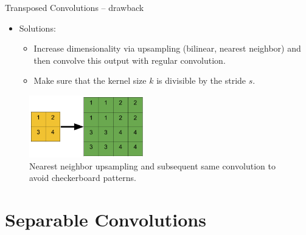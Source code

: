 \begin{vbframe}{Transposed Convolutions -- drawback}
\framebreak

\begin{itemize}
         \item Solutions: 
         \begin{itemize}
             \item Increase dimensionality via upsampling (bilinear, nearest neighbor) and then convolve this output with regular convolution.
             \item Make sure that the kernel size $k$ is divisible by the stride $s$.
         \end{itemize}
     \end{itemize}
     \begin{figure}
         \centering
         \includegraphics[width=5cm]{plots/05_conv_variations/transpose/upsample.png}
         \caption{Nearest neighbor upsampling and subsequent same convolution to avoid checkerboard patterns.}
     \end{figure}
\end{vbframe}

\section{Separable Convolutions}


